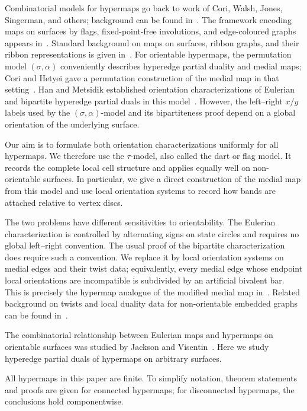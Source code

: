 \documentclass[10pt,a4paper]{article}
\theoremstyle{definition}
\theoremstyle{remark}
\begin{document}
Combinatorial models for hypermaps go back to work of Cori, Walsh, Jones, Singerman, and others; background can be found in~\cite{Cori1975,Walsh1975,JonesSingerman1978,LandoZvonkin2004}. The framework encoding maps on surfaces by flags, fixed-point-free involutions, and edge-coloured graphs appears in~\cite{Lins1982,Vince1983}. Standard background on maps on surfaces, ribbon graphs, and their ribbon representations is given in~\cite{GrossTucker1987,EllisMonaghanMoffatt2013}. For orientable hypermaps, the permutation model $(\sigma,\alpha)$ conveniently describes hyperedge partial duality and medial maps; Cori and Hetyei gave a permutation construction of the medial map in that setting~\cite{CoriHetyei2025}. Han and Metsidik established orientation characterizations of Eulerian and bipartite hyperedge partial duals in this model~\cite[Theorems~5.3 and~6.5]{HanMetsidik2026}. However, the left--right $x/y$ labels used by the $(\sigma,\alpha)$-model and its bipartiteness proof depend on a global orientation of the underlying surface.

Our aim is to formulate both orientation characterizations uniformly for all hypermaps. We therefore use the $\tau$-model, also called the dart or flag model. It records the complete local cell structure and applies equally well on non-orientable surfaces. In particular, we give a direct construction of the medial map from this model and use local orientation systems to record how bands are attached relative to vertex discs.

The two problems have different sensitivities to orientability. The Eulerian characterization is controlled by alternating signs on state circles and requires no global left--right convention. The usual proof of the bipartite characterization does require such a convention. We replace it by local orientation systems on medial edges and their twist data; equivalently, every medial edge whose endpoint local orientations are incompatible is subdivided by an artificial bivalent bar. This is precisely the hypermap analogue of the modified medial map in~\cite{DengJinMetsidik2020}. Related background on twists and local duality data for non-orientable embedded graphs can be found in~\cite{EllisMonaghanMoffatt2012}.

The combinatorial relationship between Eulerian maps and hypermaps on orientable surfaces was studied by Jackson and Visentin~\cite{JacksonVisentin1999}. Here we study hyperedge partial duals of hypermaps on arbitrary surfaces.

All hypermaps in this paper are finite. To simplify notation, theorem statements and proofs are given for connected hypermaps; for disconnected hypermaps, the conclusions hold componentwise.
\end{document}
